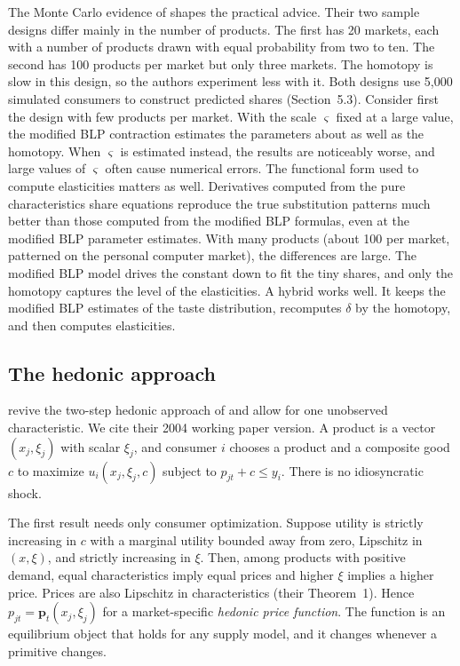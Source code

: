 The Monte Carlo evidence of \citet[Section~5]{BerryPakes2007} shapes the practical advice. Their two sample designs
differ mainly in the number of products. The first has 20 markets, each with a number of products drawn with equal
probability from two to ten. The second has 100 products per market but only three markets. The homotopy is slow
in this design, so the authors experiment less with it. Both designs use 5,000 simulated consumers to construct
predicted shares (Section~5.3).
Consider first the design with few products per market. With the scale $\varsigma$ fixed at a large value, the modified BLP contraction
estimates the parameters about as well as the homotopy. When $\varsigma$ is estimated instead, the results are
noticeably worse, and large values of $\varsigma$ often cause numerical errors. The functional form used to compute
elasticities matters as well. Derivatives computed from the pure characteristics share equations reproduce the true
substitution patterns much better than those computed from the modified BLP formulas, even at the modified BLP parameter
estimates. With many products (about 100 per market, patterned on the personal computer market), the differences are
large. The modified BLP model drives the constant down to fit the tiny shares, and only the homotopy captures the level
of the elasticities. A hybrid works well. It keeps the modified BLP estimates of the taste distribution, recomputes
$\delta$ by the homotopy, and then computes elasticities.

\subsection{The hedonic approach}\label{sec:08-hedonic}

\citet{BajariBenkard2005} revive the two-step hedonic approach of \citet{Rosen1974} and allow for one unobserved
characteristic. We cite their 2004 working paper version. A product is a vector $(x_j, \xi_j)$ with scalar $\xi_j$, and
consumer $i$ chooses a product and a composite good $c$ to maximize $u_i(x_j, \xi_j, c)$ subject to $p_{jt} + c \leq
y_i$. There is no idiosyncratic shock.

The first result needs only consumer optimization. Suppose utility is strictly increasing in $c$ with a marginal
utility bounded away from zero, Lipschitz in $(x, \xi)$, and strictly increasing in $\xi$. Then, among products with
positive demand, equal characteristics imply equal prices and higher $\xi$ implies a higher price. Prices are also
Lipschitz in characteristics (their Theorem~1). Hence $p_{jt} = \mathbf{p}_t(x_j, \xi_j)$ for a market-specific \emph{hedonic price
function}. The function is an equilibrium object that holds for any supply model, and it changes whenever a primitive
changes.

